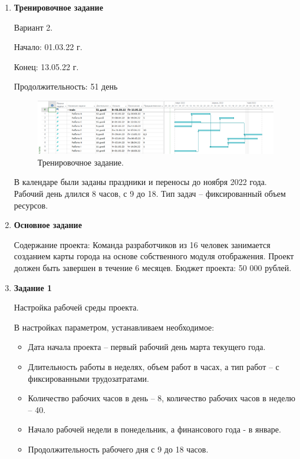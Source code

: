 \documentclass[a4paper,14pt]{extreport} %
\begin{document}
\begin{enumerate}
\item \textbf{Тренировочное задание}

Вариант 2.

Начало: 01.03.22 г.

Конец: 13.05.22 г. 

Продолжительность: 51 день

\begin{figure}[H]
  \centering
  \caption{Тренировочное задание. }
  \includegraphics[scale=0.5]{dop}
\end{figure}

В календаре были заданы праздники и переносы до ноября 2022 года. Рабочий день длился 8 часов, с 9 до 18.
Тип задач -- фиксированный объем ресурсов.

\item \textbf{Основное задание}

Содержание проекта: Команда разработчиков из 16 человек занимается созданием карты города на основе собственного модуля отображения. Проект должен быть завершен в течение 6 месяцев. Бюджет проекта: 50 000 рублей.

\item \textbf{Задание 1}

Настройка рабочей среды проекта.

В настройках параметром, устанавливаем необходимое:
\begin{itemize}
\item Дата начала проекта – первый рабочий день марта текущего года.
\item Длительность работы в неделях, объем работ в часах, а тип работ -- с фиксированными трудозатратами.
\item Количество рабочих часов в день -- 8, количество рабочих часов в неделю -- 40.
\item Начало рабочей недели в понедельник, а финансового года - в январе.
\item Продолжительность рабочего дня с 9 до 18 часов.
\end{itemize}


\end{enumerate}
\end{document}
